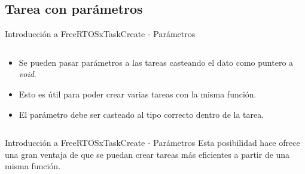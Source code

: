 \documentclass[aspectratio=169, xcolor=dvipsnames]{beamer}
\begin{document}
\subsection{Tarea con parámetros}
\begin{frame}{Introducción a FreeRTOS}{xTaskCreate - Parámetros}
\begin{columns}
\begin{column}{0.45\textwidth}
\begin{itemize}
    \item Se pueden pasar parámetros a las tareas casteando el dato como puntero a \textit{void}.
    \item Esto es útil para poder crear varias tareas con la misma función.
    \item El parámetro debe ser casteado al tipo correcto dentro de la tarea.
\end{itemize}
\end{column}
\begin{column}{0.55\textwidth}

\end{column}
\end{columns}
\end{frame}

\begin{frame}{Introducción a FreeRTOS}{xTaskCreate - Parámetros}
Esta posibilidad hace ofrece una gran ventaja de que se puedan crear tareas más eficientes a partir de una misma función.\newline
\begin{columns}
\begin{column}{0.5\textwidth}

\end{column}
\begin{column}{0.5\textwidth}

\end{column}
\end{columns}
\end{frame}
\end{document}
